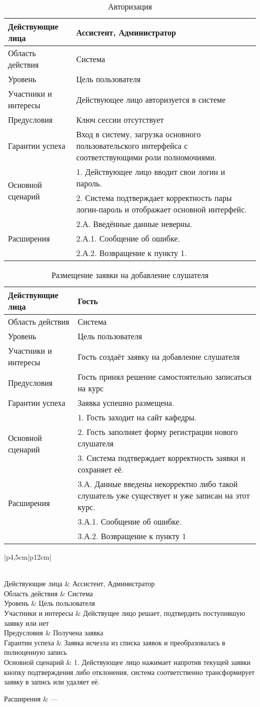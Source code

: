 \newcommand{\rowspan}[3]{
 \multirow{#1}{*}{#2} #3
}
\newcommand{\usecase}[9]{
 \begin{longtable}{|p{4,5cm}|p{12cm}|}
 \caption{#1} \\
 \hline Действующие лица & #2 \\
 \hline Область действия & #3 \\
 \hline Уровень & #4 \\
 \hline Участники и интересы & #5 \\
 \hline Предусловия & #6 \\
 \hline Гарантии успеха & #7 \\
 \hline #8
 \hline #9
 \hline
 \end{longtable}
}
\usecase{Авторизация}{Ассистент, Администратор}{Система}{Цель пользователя}{Действующее лицо авторизуется в системе}{Ключ сессии отсутствует}{Вход в систему, загрузка основного пользовательского интерфейса с соответствующими роли полномочиями.}{
\rowspan{2}{Основной сценарий}{& 1. Действующее лицо вводит свои логин и пароль.\\
\cline{2-2} & 2. Система подтверждает корректность пары логин-пароль и отображает основной интерфейс.\\ }
}{
\rowspan{3}{Расширения}{& 2.А. Введённые данные неверны.\\
\cline{2-2} & 2.А.1. Сообщение об ошибке.\\
\cline{2-2} & 2.А.2. Возвращение к пункту 1.\\ }
}
\usecase{Размещение заявки на добавление слушателя}{Гость}{Система}{Цель пользователя}{Гость создаёт заявку на добавление слушателя}{Гость принял решение самостоятельно записаться на курс}{Заявка успешно размещена.}{
\rowspan{3}{Основной сценарий}{& 1. Гость заходит на сайт кафедры.\\
\cline{2-2} & 2. Гость заполняет форму регистрации нового слушателя\\
\cline{2-2} & 3. Система подтверждает корректность заявки и сохраняет её.\\ }
}{
\rowspan{2}{Расширения}{& 3.А. Данные введены некорректно либо такой слушатель уже существует и уже записан на этот курс.\\
\cline{2-2} & 3.А.1. Сообщение об ошибке.\\
\cline{2-2} & 3.А.2. Возвращение к пункту 1\\ }
}
\usecase{Подтверждение/отклонение заявки}{Ассистент, Администратор}{Система}{Цель пользователя}{Действущее лицо решает, подтвердить поступившую заявку или нет}{Получена заявка}{Заявка исчезла из списка заявок и преобразовалась в полноценную запись}{
Основной сценарий & 1. Действующее лицо нажимает напротив текущей заявки кнопку подтверждения либо отклонения, система соответственно трансформирует заявку в запись или удаляет её.
}{
Расширения & ---\\
}
